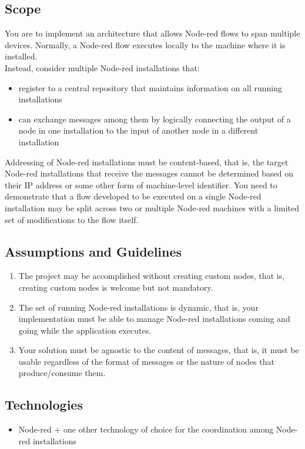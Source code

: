 \documentclass[a4paper, 12pt]{extarticle}
\begin{document}
\subsection{Scope}
You are to implement an architecture that allows Node-red flows to span multiple devices. Normally, a Node-red flow executes locally to the machine where it is installed.\\ Instead, consider multiple Node-red installations that:
\begin{itemize}
    \item register to a central repository that maintains information on all running installations
    \item can exchange messages among them by logically connecting the output of a node in one installation to the input of another node in a different installation 
\end{itemize}
Addressing of Node-red installations must be content-based, that is, the target Node-red installations that receive the messages cannot be determined based on their IP address or some other form of machine-level identifier. You need to demonstrate that a flow developed to be executed on a single Node-red installation may be split across two or multiple Node-red machines with a limited set of modifications to the flow itself.
\subsection{Assumptions and Guidelines}
\begin{enumerate}
    \item The project may be accomplished without creating custom nodes, that is, creating custom nodes is welcome but not mandatory.
\item The set of running Node-red installations is dynamic, that is, your implementation must be able to manage Node-red installations coming and going while the application executes.
\item Your solution must be agnostic to the content of messages, that is, it must be usable regardless of the format of messages or the nature of nodes that produce/consume them.
\end{enumerate}
\subsection{Technologies}
\begin{itemize}
    \item Node-red + one other technology of choice for the coordination among Node-red installations
\end{itemize}
\end{document}
